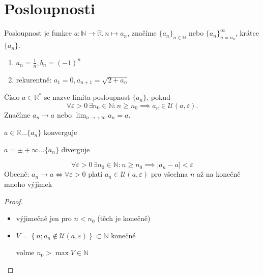 \section{Posloupnosti}

\begin{definice}
  Posloupnost je funkce $a: \mathbb N \to \mathbb R, n \mapsto a_n$, značíme $\{a_n\}_{n\in\mathbb N}$ nebo $\{a_n\}_{n=n_0}^{\infty}$, krátce $\{a_n\}$.
\end{definice}

\begin{priklad}
  \begin{enumerate}[1.]
    \item $a_n = \frac{1}{n}, b_n = (-1)^n$
    \item rekurentně: $a_1 = 0, a_{n+1} = \sqrt{2+a_n}$
  \end{enumerate}
\end{priklad}

\begin{definice}
  Číslo $a\in\mathbb R^*$ se nazve limita posloupnost $\{a_n\}$, pokud
  $$\forall \varepsilon > 0 \,\exists n_0 \in \mathbb N: n \geq n_0 \implies a_n \in \mathscr U(a, \varepsilon).$$
  Značíme $a_n \to a$ nebo $\lim_{n \to+\infty} a_n = a$.
\end{definice}

\begin{poznamka}
  $a \in \mathbb R \dots \{a_n\}$ konverguje

  $a = \pm+\infty \dots \{a_n\}$ diverguje
\end{poznamka}

\begin{poznamka}
  $$\forall \varepsilon > 0 \,\exists n_0 \in \mathbb N: n \geq n_0 \implies |a_n-a|<\varepsilon$$
  Obecně: $a_n \to a \iff \forall \varepsilon > 0$ platí $a_n \in \mathscr U(a, \varepsilon)$ pro všechna $n$ až na konečně mnoho výjimek
\end{poznamka}

\begin{proof}
  \begin{itemize}
    \item[\uv{$\implies$}] výjimečně jen pro $n < n_0$ (těch je konečně)
    \item[\uv{$\impliedby$}] $V = \left\{n; a_n \notin \mathscr U(a, \varepsilon)\right\} \subset \mathbb N$ konečné

    volme $n_0 > \max V \in \mathbb N$
  \end{itemize}
\end{proof}

